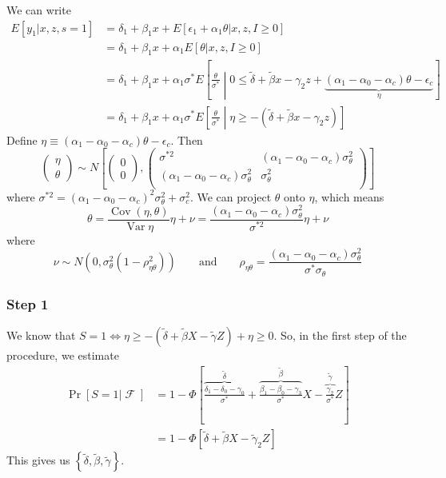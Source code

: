 \documentclass[11pt,letterpaper]{article}
\DeclareMathOperator{\Var}{Var}
\DeclareMathOperator{\Cov}{Cov}
\DeclareMathOperator\F{\mathcal{F}}
\begin{document}
We can write
\begin{align*}
E[y_1 | x,z,s=1] 
&= \delta_1 + \beta_1 x + E[\epsilon_1 + \alpha_1\theta | x,z, I\geq 0] \\
&= \delta_1 + \beta_1 x + \alpha_1 E[\theta | x,z, I\geq 0] \\
&= \delta_1 + \beta_1 x + \alpha_1\sigma^* E\left[\frac{\theta}{\sigma^*} \middle|0 \leq \widetilde \delta + \widetilde \beta x - \gamma_2 z + \underbrace{(\alpha_1 - \alpha_0 - \alpha_c)\theta - \epsilon_c}_\eta  \right] \\
&= \delta_1 + \beta_1 x + \alpha_1\sigma^* E\left[\frac{\theta}{\sigma^*} \middle| \eta \geq - \left( \widetilde \delta + \widetilde \beta x - \gamma_2 z  \right) \right]
\end{align*}
Define $\eta \equiv (\alpha_1 - \alpha_0 - \alpha_c)\theta - \epsilon_c$. Then 
\[
\begin{pmatrix} \eta \\ \theta \end{pmatrix} 
\sim N
\left[ 
	\begin{pmatrix} 0 \\ 0  \end{pmatrix}, 
	\begin{pmatrix} 
		\sigma^{*2}     & (\alpha_1 - \alpha_0 - \alpha_c)\sigma^2_\theta \\
		(\alpha_1 - \alpha_0 - \alpha_c)\sigma^2_\theta & \sigma^2_\theta \\
	\end{pmatrix}
\right] 
\]
where $\sigma^{*2} = (\alpha_1 - \alpha_0 - \alpha_c)^2\sigma^2_\theta + \sigma^2_c$. We can project $\theta$ onto $\eta$, which means
\[
\theta = \frac{\Cov(\eta,\theta)}{\Var \eta } \eta + \nu = \frac{(\alpha_1 - \alpha_0 - \alpha_c)\sigma^2_\theta}{\sigma^{*2}}\eta + \nu
\]
where
\[
\nu \sim N\left( 0, \sigma^2_\theta \left( 1- \rho_{\eta\theta}^2\right)\right)
\qquad\text{and} \qquad
\rho_{\eta\theta} = \frac{(\alpha_1 - \alpha_0 - \alpha_c)\sigma^2_\theta}{\sigma^{*}\sigma_\theta}
\]

\subsubsection{Step 1}

We know that $S=1 \Leftrightarrow \eta \geq -(\widetilde \delta + \widetilde \beta X - \widetilde \gamma Z) + \eta \geq 0$. So, in the first step of the procedure, we estimate
\begin{align*}
\Pr[S=1|\F] 
&= 1 - \Phi\left[\overbrace{\frac{\delta_1  - \delta_0 - \gamma_0}{\sigma^*}}^{\widetilde \delta} + \overbrace{\frac{\beta_1 - \beta_0 - \gamma_3}{\sigma^*}}^{\widetilde \beta} X - \overbrace{\frac{\gamma_2}{\sigma^*}}^{\widetilde \gamma} Z 
\right] \\
&= 1- \Phi\left[\widetilde \delta + \widetilde \beta X - \widetilde\gamma_2 Z 
\right] 
\end{align*}
This gives us $\left\{ \widetilde \delta, \widetilde \beta, \widetilde \gamma \right\}$.
\end{document}

